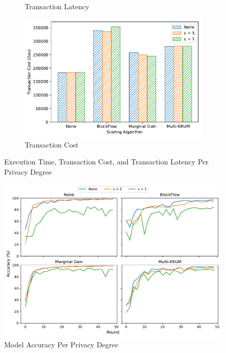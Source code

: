 \begin{figure}[!hpt]
\begin{subfigure}[b]{0.47\textwidth}
        \caption{Transaction Latency}
    \end{subfigure}
    \hfill
    \begin{subfigure}[b]{0.47\textwidth}
        \centering
        \includegraphics[width=\textwidth]{graphics/privacy/tx_cost.pdf}
        \caption{Transaction Cost}
    \end{subfigure}
    \caption{Execution Time, Transaction Cost, and Transaction Latency Per Privacy Degree}
    \label{fig:priv_metrics}
\end{figure}

\begin{figure}[!hpb]
    \centering
    \includegraphics[width=\textwidth]{graphics/privacy/accuracy.pdf}
    \caption{Model Accuracy Per Privacy Degree}
    \label{fig:accuracy_privacy}
\end{figure}

